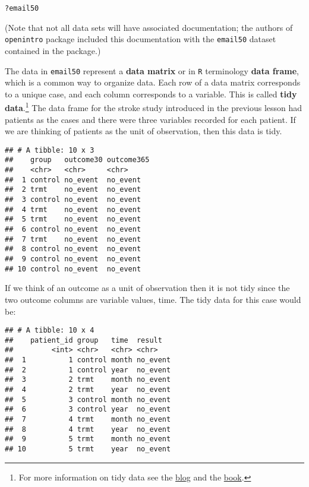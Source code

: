 \documentclass[
]{article}
\begin{document}
\begin{verbatim}
?email50
\end{verbatim}

(Note that not all data sets will have associated documentation; the
authors of \texttt{openintro} package included this documentation with
the \texttt{email50} dataset contained in the package.)

The data in \texttt{email50} represent a \textbf{data matrix} or in
\texttt{R} terminology \textbf{data frame}, which is a common way to
organize data. Each row of a data matrix corresponds to a unique case,
and each column corresponds to a variable. This is called \textbf{tidy
data}.\footnote{For more information on tidy data see the
  \href{https://simplystatistics.org/2016/02/17/non-tidy-data/}{blog}
  and the \href{https://r4ds.had.co.nz/tidy-data.html\#pivoting}{book}.}
The data frame for the stroke study introduced in the previous lesson
had patients as the cases and there were three variables recorded for
each patient. If we are thinking of patients as the unit of observation,
then this data is tidy.

\begin{verbatim}
## # A tibble: 10 x 3
##    group   outcome30 outcome365
##    <chr>   <chr>     <chr>     
##  1 control no_event  no_event  
##  2 trmt    no_event  no_event  
##  3 control no_event  no_event  
##  4 trmt    no_event  no_event  
##  5 trmt    no_event  no_event  
##  6 control no_event  no_event  
##  7 trmt    no_event  no_event  
##  8 control no_event  no_event  
##  9 control no_event  no_event  
## 10 control no_event  no_event
\end{verbatim}

If we think of an outcome as a unit of observation then it is not tidy
since the two outcome columns are variable values, time. The tidy data
for this case would be:

\begin{verbatim}
## # A tibble: 10 x 4
##    patient_id group   time  result  
##         <int> <chr>   <chr> <chr>   
##  1          1 control month no_event
##  2          1 control year  no_event
##  3          2 trmt    month no_event
##  4          2 trmt    year  no_event
##  5          3 control month no_event
##  6          3 control year  no_event
##  7          4 trmt    month no_event
##  8          4 trmt    year  no_event
##  9          5 trmt    month no_event
## 10          5 trmt    year  no_event
\end{verbatim}
\end{document}
